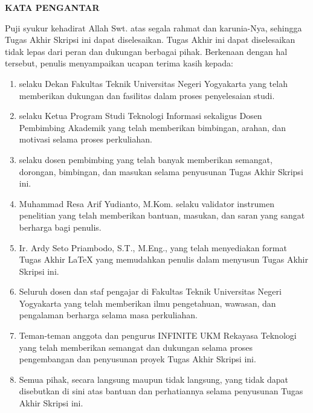 
\clearpage
{}
{}
\begin{center}
    \textbf{\large KATA PENGANTAR}\\[3em]
\end{center}

Puji syukur kehadirat Allah Swt. atas segala rahmat dan karunia-Nya, sehingga Tugas Akhir Skripsi ini dapat diselesaikan. Tugas Akhir ini dapat diselesaikan tidak lepas dari peran dan dukungan berbagai pihak. Berkenaan dengan hal tersebut, penulis menyampaikan ucapan terima kasih kepada:

\begin{enumerate}
    \item {\dekan} selaku Dekan Fakultas Teknik Universitas Negeri Yogyakarta yang telah memberikan dukungan dan fasilitas dalam proses penyelesaian studi.
    \item {\koorprodi} selaku Ketua Program Studi Teknologi Informasi sekaligus Dosen Pembimbing Akademik yang telah memberikan bimbingan, arahan, dan motivasi selama proses perkuliahan.
    \item {\pembimbing} selaku dosen pembimbing yang telah banyak memberikan semangat, dorongan, bimbingan, dan masukan selama penyusunan Tugas Akhir Skripsi ini.
    \item Muhammad Resa Arif Yudianto, M.Kom. selaku validator instrumen penelitian yang telah memberikan bantuan, masukan, dan saran yang sangat berharga bagi penulis.
    \item Ir. Ardy Seto Priambodo, S.T., M.Eng., yang telah menyediakan format Tugas Akhir LaTeX yang memudahkan penulis dalam menyusun Tugas Akhir Skripsi ini.
    \item Seluruh dosen dan staf pengajar di Fakultas Teknik Universitas Negeri Yogyakarta yang telah memberikan ilmu pengetahuan, wawasan, dan pengalaman berharga selama masa perkuliahan.
    \item Teman-teman anggota dan pengurus INFINITE UKM Rekayasa Teknologi yang telah memberikan semangat dan dukungan selama proses pengembangan dan penyusunan proyek Tugas Akhir Skripsi ini.
    \item Semua pihak, secara langsung maupun tidak langsung, yang tidak dapat disebutkan di sini atas bantuan dan perhatiannya selama penyusunan Tugas Akhir Skripsi ini.
\end{enumerate}


